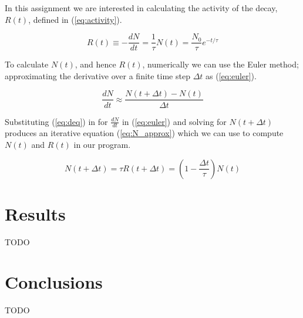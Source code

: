 \documentclass[notitlepage,aps,prd,nofootinbib]{revtex4-1}
\begin{document}
In this assignment we are interested in calculating the activity of the decay, $R\left(t\right)$, defined in (\ref{eq:activity}).

\begin{equation} \label{eq:activity}
R\left(t\right) \equiv -\frac{d N}{d t} = \frac{1}{\tau} N\left(t\right) = \frac{N_{0}}{\tau} e^{-t/\tau}
\end{equation}

To calculate $N\left(t\right)$, and hence $R\left(t\right)$, numerically we can use the Euler method; approximating the derivative over a finite time step $\Delta t$ as (\ref{eq:euler}).

\begin{equation} \label{eq:euler}
\frac{d N}{d t} \approx \frac{N\left(t+\Delta t\right)-N\left(t\right)}{\Delta t}
\end{equation}

Substituting (\ref{eq:deq}) in for $\frac{d N}{d t}$ in (\ref{eq:euler}) and solving for $N\left(t+\Delta t\right)$ produces an iterative equation (\ref{eq:N_approx}) which we can use to compute $N\left(t\right)$ and $R\left(t\right)$ in our program.

\begin{equation} \label{eq:N_approx}
N\left(t+\Delta t\right) = \tau R\left(t+\Delta t\right) = \left(1-\frac{\Delta t}{\tau}\right) N\left(t\right)
\end{equation}


\section{Results}
\label{sec:results}
TODO

\section{Conclusions}
\label{sec:Conclusions}
TODO



\clearpage

\end{document}
